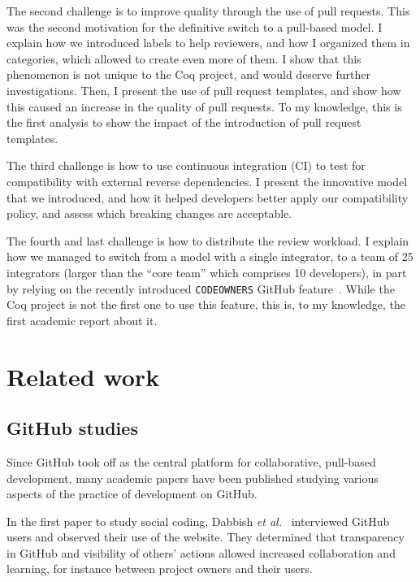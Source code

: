The second challenge is to improve quality through the use of pull requests.
This was the second motivation for the definitive switch to a pull-based model.
I explain how we introduced labels to help reviewers, and how I organized them in categories, which allowed to create even more of them.
I show that this phenomenon is not unique to the Coq project, and would deserve further investigations.
Then, I present the use of pull request templates, and show how this caused an increase in the quality of pull requests.
To my knowledge, this is the first analysis to show the impact of the introduction of pull request templates.

The third challenge is how to use continuous integration (CI) to test for compatibility with external reverse dependencies.
I present the innovative model that we introduced, and how it helped developers better apply our compatibility policy, and assess which breaking changes are acceptable.

The fourth and last challenge is how to distribute the review workload.
I explain how we managed to switch from a model with a single integrator, to a team of 25 integrators (larger than the ``core team'' which comprises 10 developers), in part by relying on the recently introduced \verb|CODEOWNERS| GitHub feature~\cite{github_code_owners}.
While the Coq project is not the first one to use this feature, this is, to my knowledge, the first academic report about it.

\section{Related work}

\subsection{GitHub studies}

Since GitHub took off as the central platform for collaborative, pull-based development, many academic papers have been published studying various aspects of the practice of development on GitHub.

In the first paper to study social coding, Dabbish \emph{et al.}~\cite{dabbish2012social} interviewed GitHub users and observed their use of the website. They determined that transparency in GitHub and visibility of others' actions allowed increased collaboration and learning, for instance between project owners and their users.

